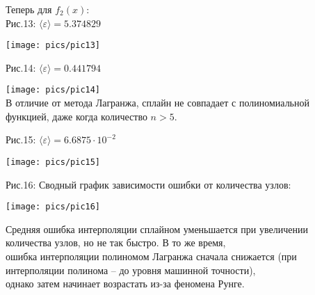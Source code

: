 \newpage
Теперь для $f_2(x)$:\\[-0.5cm]
{\normalsize Рис.13: $\langle\varepsilon\rangle = 5.374829$}
\begin{center}
    \texttt{[image: pics/pic13]}\\
\end{center}
\vspace{-0.7cm}
{\normalsize Рис.14: $\langle\varepsilon\rangle = 0.441794$}
\begin{center}
    \texttt{[image: pics/pic14]}\\
    \vspace{-0.7cm}
    {\small В отличие от метода Лагранжа, сплайн не совпадает с полиномиальной функцией, даже когда количество $n>5$.}
\end{center}
\newpage


{\normalsize Рис.15: $\langle\varepsilon\rangle = 6.6875\cdot10^{-2}$}
\begin{center}
    \texttt{[image: pics/pic15]}\\
\end{center}

{\normalsize Рис.16: Сводный график зависимости ошибки от количества узлов:}
\begin{center}
    \texttt{[image: pics/pic16]}\\
\end{center}
{\small Средняя ошибка интерполяции сплайном уменьшается при увеличении количества узлов, но не так быстро. В то же время,\\[-0.5cm]
    ошибка интерполяции полиномом Лагранжа сначала снижается (при интерполяции полинома -- до уровня машинной точности),\\[-0.5cm]
    однако затем начинает возрастать из-за феномена Рунге.}